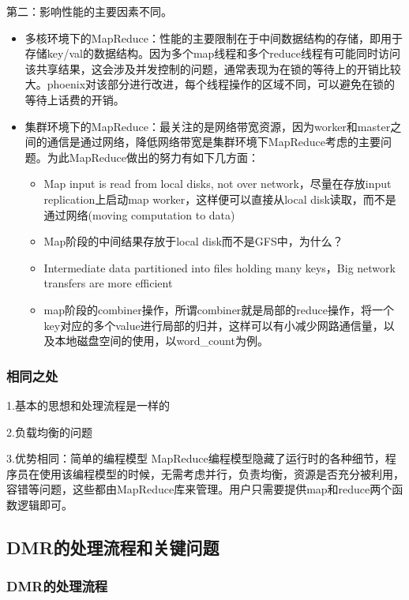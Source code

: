 第二：影响性能的主要因素不同。
\begin{itemize}
  \item 多核环境下的MapReduce：性能的主要限制在于中间数据结构的存储，即用于存储key/val的数据结构。因为多个map线程和多个reduce线程有可能同时访问该共享结果，这会涉及并发控制的问题，通常表现为在锁的等待上的开销比较大。phoenix对该部分进行改进，每个线程操作的区域不同，可以避免在锁的等待上话费的开销。
  \item 集群环境下的MapReduce：最关注的是网络带宽资源，因为worker和master之间的通信是通过网络，降低网络带宽是集群环境下MapReduce考虑的主要问题。为此MapReduce做出的努力有如下几方面：
  
\begin{itemize}
  \item Map input is read from local disks, not over network，尽量在存放input replication上启动map worker，这样便可以直接从local disk读取，而不是通过网络(moving computation to data)
  \item Map阶段的中间结果存放于local disk而不是GFS中，为什么？
  \item Intermediate data partitioned into files holding many keys，Big network transfers are more efficient
  \item map阶段的combiner操作，所谓combiner就是局部的reduce操作，将一个key对应的多个value进行局部的归并，这样可以有小减少网路通信量，以及本地磁盘空间的使用，以word\_count为例。
\end{itemize}
  
\end{itemize}


\subsubsection{相同之处}
1.基本的思想和处理流程是一样的


2.负载均衡的问题

3.优势相同：简单的编程模型
MapReduce编程模型隐藏了运行时的各种细节，程序员在使用该编程模型的时候，无需考虑并行，负责均衡，资源是否充分被利用，容错等问题，这些都由MapReduce库来管理。用户只需要提供map和reduce两个函数逻辑即可。

\subsection{DMR的处理流程和关键问题}
\subsubsection{DMR的处理流程}

